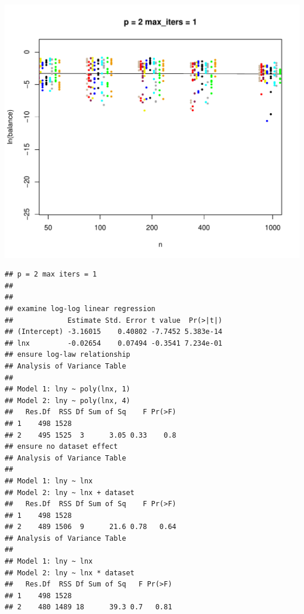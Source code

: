 \documentclass{article}\usepackage[]{graphicx}\usepackage[]{color}
\makeatletter
\def\maxwidth{ %
  \ifdim\Gin@nat@width>\linewidth
    \linewidth
  \else
    \Gin@nat@width
  \fi
}
\newenvironment{kframe}{%
 \def\at@end@of@kframe{}%
 \ifinner\ifhmode%
  \def\at@end@of@kframe{\end{minipage}}%
  \begin{minipage}{\columnwidth}%
 \fi\fi%
 \def\FrameCommand##1{\hskip\@totalleftmargin \hskip-\fboxsep
 \colorbox{shadecolor}{##1}\hskip-\fboxsep
     \hskip-\linewidth \hskip-\@totalleftmargin \hskip\columnwidth}%
 \MakeFramed {\advance\hsize-\width
   \@totalleftmargin\z@ \linewidth\hsize
   \@setminipage}}%
 {\par\unskip\endMakeFramed%
 \at@end@of@kframe}
\newenvironment{knitrout}{}{} %
\makeatother
\begin{document}
\begin{knitrout}
\includegraphics[width=\maxwidth]{figure/load_and_cleanup_data10} 
\begin{kframe}\begin{verbatim}
## p = 2 max iters = 1 
## 
## 
## examine log-log linear regression
##             Estimate Std. Error t value  Pr(>|t|)
## (Intercept) -3.16015    0.40802 -7.7452 5.383e-14
## lnx         -0.02654    0.07494 -0.3541 7.234e-01
## ensure log-law relationship
## Analysis of Variance Table
## 
## Model 1: lny ~ poly(lnx, 1)
## Model 2: lny ~ poly(lnx, 4)
##   Res.Df  RSS Df Sum of Sq    F Pr(>F)
## 1    498 1528                         
## 2    495 1525  3      3.05 0.33    0.8
## ensure no dataset effect
## Analysis of Variance Table
## 
## Model 1: lny ~ lnx
## Model 2: lny ~ lnx + dataset
##   Res.Df  RSS Df Sum of Sq    F Pr(>F)
## 1    498 1528                         
## 2    489 1506  9      21.6 0.78   0.64
## Analysis of Variance Table
## 
## Model 1: lny ~ lnx
## Model 2: lny ~ lnx * dataset
##   Res.Df  RSS Df Sum of Sq   F Pr(>F)
## 1    498 1528                        
## 2    480 1489 18      39.3 0.7   0.81
\end{verbatim}
\end{kframe}

\end{knitrout}
\end{document}
